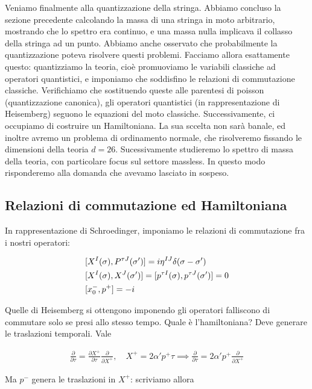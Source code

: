 \documentclass{report}
\begin{document}
Veniamo finalmente alla quantizzazione della stringa. Abbiamo concluso la sezione precedente calcolando la massa di una stringa in moto arbitrario, mostrando che lo spettro era continuo, e una massa nulla implicava il collasso della stringa ad un punto. Abbiamo anche osservato che probabilmente la quantizzazione poteva risolvere questi problemi. Facciamo allora esattamente questo: quantizziamo la teoria, cioè promuoviamo le variabili classiche ad operatori quantistici, e imponiamo che soddisfino le relazioni di commutazione classiche. Verifichiamo che sostituendo queste alle parentesi di poisson (quantizzazione canonica), gli operatori quantistici (in rappresentazione di Heisemberg) seguono le equazioni del moto classiche. Successivamente, ci occupiamo di costruire un Hamiltoniana. La sua sccelta non sarà banale, ed inoltre avremo un problema di ordinamento normale, che risolveremo fissando le dimensioni della teoria \(d = 26\). Sucessivamente studieremo lo spettro di massa della teoria, con particolare focus sul settore massless. In questo modo risponderemo alla domanda che avevamo lasciato in sospeso.  

\subsection{Relazioni di commutazione ed Hamiltoniana}

In rappresentazione di Schroedinger, imponiamo le relazioni di commutazione fra i nostri operatori: 

\begin{align}
    &[X^I(\sigma), P^{\tau J}(\sigma')] = i\eta^{IJ}\delta(\sigma-\sigma') \notag \\
    &[X^I(\sigma), X^J(\sigma')] = [p^{\tau I}(\sigma), p^{\tau J}(\sigma')] = 0 \notag \\ 
    &[x_0^-, p^+] = -i 
\end{align}

Quelle di Heisemberg si ottengono imponendo gli operatori falliscono di commutare solo se presi allo stesso tempo. Quale è l'hamiltoniana? Deve generare le traslazioni temporali. Vale 

\begin{align}
    \frac{\partial}{\partial \tau} = \frac{\partial X^+}{\partial \tau}\frac{\partial}{\partial X^+}, \quad X^+ = 2\alpha' p^+ \tau \implies \frac{\partial}{\partial \tau} = 2\alpha' p^+ \frac{\partial}{\partial X^+}
\end{align}

Ma \(p^-\) genera le traslazioni in \(X^+\): scriviamo allora 
\end{document}
